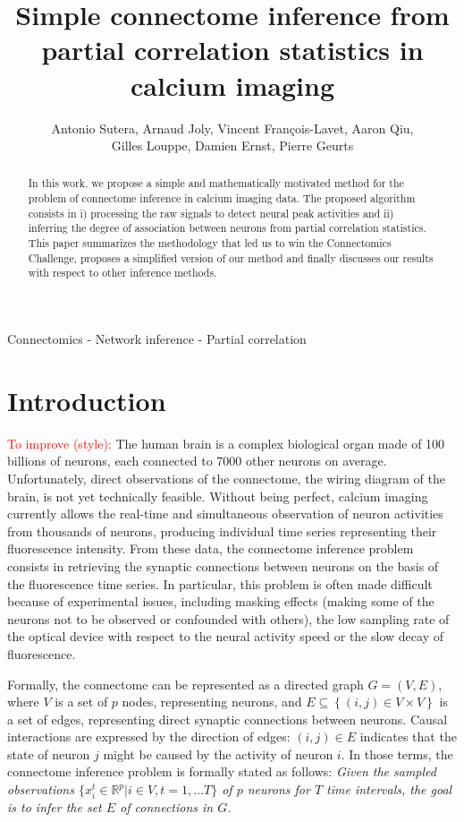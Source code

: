 \documentclass[wcp]{jmlr}
\title{Simple connectome inference from partial correlation statistics in calcium imaging}
\author{Antonio Sutera,
        Arnaud Joly,
        Vincent François-Lavet,
        Aaron Qiu, \\
        Gilles Louppe,
        Damien Ernst,
        Pierre Geurts}
\begin{document}
\maketitle

\begin{abstract}
In this work, we propose a simple and mathematically motivated method for the
problem of connectome inference in calcium imaging data. The proposed algorithm
consists in i) processing the raw signals to detect neural peak activities and ii)
inferring the degree of association between neurons from partial correlation
statistics.  This paper summarizes the methodology that led us to win the
Connectomics Challenge, proposes a simplified version of our method and finally
discusses our results with respect to other inference methods.
\end{abstract}

\begin{keywords}
Connectomics - Network inference - Partial correlation
\end{keywords}


\section{Introduction}\label{sec:intro}

\textcolor{red}{To improve (style):} The human brain is a complex biological organ made of 100 billions of neurons,
each connected to 7000 other neurons on average. Unfortunately, direct
observations of the connectome, the wiring diagram of the brain, is not yet
technically feasible. Without being perfect, calcium imaging currently allows
the real-time and simultaneous observation of neuron activities from thousands
of neurons, producing individual time series representing their fluorescence
intensity. From these data, the connectome inference problem consists in
retrieving the synaptic connections between neurons on the basis of the
fluorescence time series. In particular, this problem is often made difficult
because of experimental issues, including masking effects (making some of the
neurons not to be observed or confounded with others), the low sampling rate of
the optical device with respect to the neural activity speed or the slow decay
of fluorescence.

Formally, the connectome can be represented as a directed graph $G=(V,E)$,
where $V$ is a set of $p$ nodes, representing neurons, and $E \subseteq
\left\{(i, j) \in V \times V\right\}$ is a set of edges, representing direct
synaptic connections between neurons. Causal interactions are expressed by the
direction of edges: $(i, j) \in E$ indicates that the state of neuron $j$ might
be caused by the activity of neuron $i$. In those terms,  the connectome
inference problem is formally stated as follows:  \textit{Given the sampled
observations $\{ x^t_i \in \mathbb{R}^{p} | i \in V, t = 1, \dots T \}$ of $p$
neurons for $T$ time intervals, the goal is to infer the set $E$ of connections in $G$.}
\end{document}
